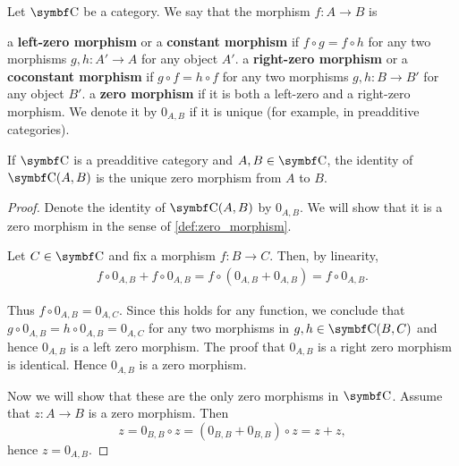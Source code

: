 \begin{definition}\label{def:zero_morphism}
  Let \( \Bold C \) be a category. We say that the morphism \( f: A \to B \) is
  \begin{defenum}
     a \textbf{left-zero morphism} or a \textbf{constant morphism} if \( f \circ g = f \circ h \) for any two morphisms \( g, h: A' \to A \) for any object \( A' \).
     a \textbf{right-zero morphism} or a \textbf{coconstant morphism} if \( g \circ f = h \circ f \) for any two morphisms \( g, h: B \to B' \) for any object \( B' \).
     a \textbf{zero morphism} if it is both a left-zero and a right-zero morphism. We denote it by \( 0_{A,B} \) if it is unique (for example, in preadditive categories).
  \end{defenum}
\end{definition}

\begin{proposition}\label{def:preadditive_zero_morphisms}
  If \( \Bold C \) is a preadditive category and \( A, B \in \Bold{C} \), the identity of \( \Bold{C}(A, B) \) is the unique zero morphism from \( A \) to \( B \).
\end{proposition}
\begin{proof}
  Denote the identity of \( \Bold{C}(A, B) \) by \( 0_{A,B} \). We will show that it is a zero morphism in the sense of \cref{def:zero_morphism}.

  Let \( C \in \Bold{C} \) and fix a morphism \( f: B \to C \). Then, by linearity,
  \begin{align*}
    f \circ 0_{A,B} + f \circ 0_{A,B}
    =
    f \circ (0_{A,B} + 0_{A,B})
    =
    f \circ 0_{A,B}.
  \end{align*}

  Thus \( f \circ 0_{A,B} = 0_{A,C} \). Since this holds for any function, we conclude that \( g \circ 0_{A,B} = h \circ 0_{A,B} = 0_{A,C} \) for any two morphisms in \( g, h \in \Bold{C}(B,C) \) and hence \( 0_{A,B} \) is a left zero morphism. The proof that \( 0_{A,B} \) is a right zero morphism is identical. Hence \( 0_{A,B} \) is a zero morphism.

  Now we will show that these are the only zero morphisms in \( \Bold{C} \). Assume that \( z: A \to B \) is a zero morphism. Then
  \begin{equation*}
    z = 0_{B,B} \circ z = (0_{B,B} + 0_{B,B}) \circ z = z + z,
  \end{equation*}
  hence \( z = 0_{A,B} \).
\end{proof}

